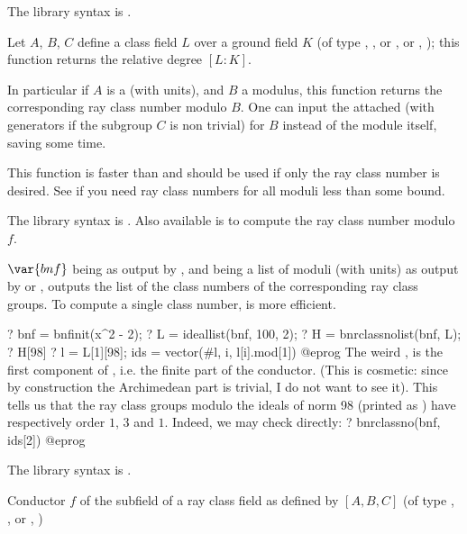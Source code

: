 The library syntax is .

\label{se:bnrclassno}
Let $A$, $B$, $C$ define a class field $L$ over a ground field $K$
(of type ,
,
or ,
or ,
); this function returns the relative degree $[L:K]$.

In particular if $A$ is a  (with units), and $B$ a modulus,
this function returns the corresponding ray class number modulo $B$.
One can input the attached  (with generators if the subgroup
$C$ is non trivial) for $B$ instead of the module itself, saving some time.

This function is faster than  and should be used if only the
ray class number is desired. See  if you need ray class
numbers for all moduli less than some bound.

The library syntax is .
Also available is
 to compute the ray class number
modulo~$f$.

\label{se:bnrclassnolist}
$\var{bnf}$ being as
output by , and  being a list of moduli (with units) as
output by  or , outputs the list of the
class numbers of the corresponding ray class groups. To compute a single
class number,  is more efficient.

\bprog
? bnf = bnfinit(x^2 - 2);
? L = ideallist(bnf, 100, 2);
? H = bnrclassnolist(bnf, L);
? H[98]
? l = L[1][98]; ids = vector(#l, i, l[i].mod[1])
@eprog
The weird , is the first component of , i.e.
the finite part of the conductor. (This is cosmetic: since by construction
the Archimedean part is trivial, I do not want to see it). This tells us that
the ray class groups modulo the ideals of norm 98 (printed as ) have
respectively order $1$, $3$ and $1$. Indeed, we may check directly:
\bprog
? bnrclassno(bnf, ids[2])
@eprog

The library syntax is .

\label{se:bnrconductor}
Conductor $f$ of the subfield of a ray class field as defined by $[A,B,C]$
(of type ,
,
 or
,
)

